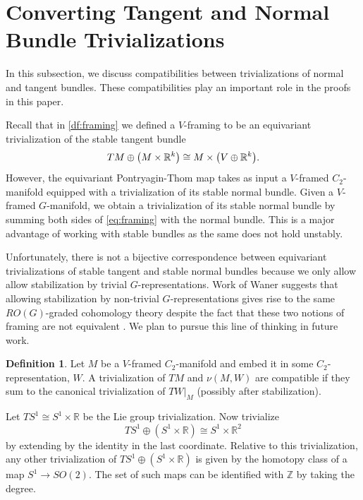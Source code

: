 \documentclass[11pt]{amsart}
\newcommand{\R}{\mathbb R}
\newcommand{\Z}{\mathbb{Z}}
\theoremstyle{plain}   %
\theoremstyle{definition}
\newtheorem{df}[thm]{Definition}
\theoremstyle{remark}
\numberwithin{equation}{section}
\let\originalleft\left
\let\originalright\right
\renewcommand{\left}{\mathopen{}\mathclose\bgroup\originalleft}
\renewcommand{\right}{\aftergroup\egroup\originalright}
\begin{document}
\section{Converting Tangent and Normal Bundle Trivializations}\label{subsec:framing}

In this subsection, we discuss compatibilities between trivializations of normal and tangent bundles. These compatibilities play an important role in the proofs in this paper. 

Recall that in \cref{df:framing} we defined a $V$-framing to be an equivariant trivialization of the stable tangent bundle
\begin{equation}\label{eq:framing}
TM\oplus\left(M\times\R^k\right)\cong M\times\left(V\oplus\R^k\right).
\end{equation}
However, the equivariant Pontryagin-Thom map takes as input a $V$-framed $C_2$-manifold equipped with a trivialization of its stable normal bundle. Given a $V$-framed $G$-manifold, we obtain a trivialization of its stable normal bundle by summing both sides of \cref{eq:framing} with the normal bundle. This is a major advantage of working with stable bundles as the same does not hold unstably. 

Unfortunately, there is not a bijective correspondence between equivariant trivializations of stable tangent and stable normal bundles because we only allow allow stabilization by trivial $G$-representations. Work of Waner suggests that allowing stabilization by non-trivial $G$-representations gives rise to the same $RO(G)$-graded cohomology theory despite the fact that these two notions of framing are not equivalent \cite{waner_1984_eq_bordism}. We plan to pursue this line of thinking in future work. 
 
\begin{df}
Let $M$ be a $V$-framed $C_2$-manifold and embed it in some $C_2$-representation, $W$. A trivialization of $TM$ and $\nu(M,W)$ are compatible if they sum to the canonical trivialization of $TW|_M$ (possibly after stabilization). 
\end{df}

Let $TS^1\cong S^1\times\R$ be the Lie group trivialization. Now trivialize
\begin{equation}\label{eq:first_triv}
TS^1\oplus (S^1\times \R) \cong S^1\times\R^2
\end{equation}
by extending by the identity in the last coordinate. Relative to this trivialization, any other trivialization of $TS^1\oplus (S^1\times \R)$ is given by the homotopy class of a map $S^1\to SO(2)$. The set of such maps can be identified with $\Z$ by taking the degree. 
\end{document}
